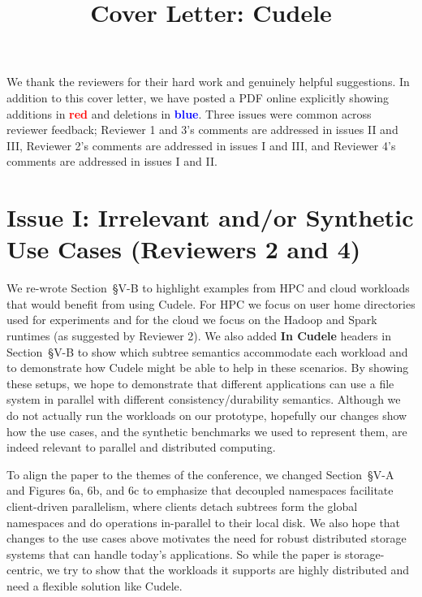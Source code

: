 \documentclass[onecolumn,conference]{IEEEtran}
\begin{document}
\title{Cover Letter: Cudele}
\maketitle

We thank the reviewers for their hard work and genuinely helpful suggestions.
In addition to this cover letter, we have posted a PDF online explicitly
showing additions in \textcolor{red}{\textbf{red}} and deletions in
\textcolor{blue}{\textbf{blue}}. Three issues were common across reviewer
feedback; Reviewer 1 and 3's comments are addressed in issues II and III,
Reviewer 2's comments are addressed in issues I and III, and Reviewer 4's
comments are addressed in issues I and II. 

\section*{Issue I: Irrelevant and/or Synthetic Use Cases (Reviewers 2 and 4)}

We re-wrote Section~{\S}V-B to highlight examples from HPC and cloud workloads
that would benefit from using Cudele. For HPC we focus on user home directories
used for experiments and for the cloud we focus on the Hadoop and Spark
runtimes (as suggested by Reviewer 2).  We also added \textbf{In Cudele}
headers in Section~{\S}V-B to show which subtree semantics accommodate each
workload and to demonstrate how Cudele might be able to help in these
scenarios.  By showing these setups, we hope to demonstrate that different
applications can use a file system in parallel with different
consistency/durability semantics.  Although we do not actually run the
workloads on our prototype, hopefully our changes show how the use cases, and
the synthetic benchmarks we used to represent them, are indeed relevant to
parallel and distributed computing.

To align the paper to the themes of the conference, we changed Section~{\S}V-A
and Figures 6a, 6b, and 6c to emphasize that decoupled namespaces facilitate
client-driven parallelism, where clients detach subtrees form the global namespaces
and do operations in-parallel to their local disk. We also hope that changes to
the use cases above motivates the need for robust distributed storage systems
that can handle today's applications.  So while the paper is storage-centric,
we try to show that the workloads it supports are highly distributed and need a
flexible solution like Cudele.  
\end{document}

